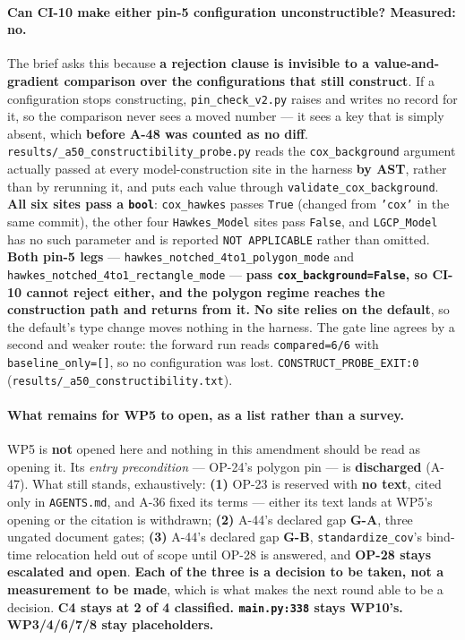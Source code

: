 \documentclass[
  10pt,
]{article}
\begin{document}
\paragraph{Can CI-10 make either pin-5 configuration unconstructible? Measured: no.}
The brief asks this because \textbf{a rejection clause is invisible to a value-and-gradient comparison over the configurations that still construct}. If a configuration stops constructing, \texttt{pin\_check\_v2.py} raises and writes no record for it, so the comparison never sees a moved number --- it sees a key that is simply absent, which \textbf{before A-48 was counted as no diff}. \texttt{results/\allowbreak{}\_a50\_constructibility\_probe.py} reads the \texttt{cox\_background} argument actually passed at every model-construction site in the harness \textbf{by AST}, rather than by rerunning it, and puts each value through \texttt{validate\_cox\_background}. \textbf{All six sites pass a \texttt{bool}}: \texttt{cox\_hawkes} passes \texttt{True} (changed from \texttt{'cox'} in the same commit), the other four \texttt{Hawkes\_Model} sites pass \texttt{False}, and \texttt{LGCP\_Model} has no such parameter and is reported \texttt{NOT APPLICABLE} rather than omitted. \textbf{Both pin-5 legs} --- \texttt{hawkes\_notched\_4to1\_polygon\_mode} and \texttt{hawkes\_notched\_4to1\_rectangle\_mode} --- \textbf{pass \texttt{cox\_background=False}, so CI-10 cannot reject either, and the polygon regime reaches the construction path and returns from it.} \textbf{No site relies on the default}, so the default's type change moves nothing in the harness. The gate line agrees by a second and weaker route: the forward run reads \texttt{compared=6/6} with \texttt{baseline\_only=[]}, so no configuration was lost. \texttt{CONSTRUCT\_PROBE\_EXIT:0} (\texttt{results/\allowbreak{}\_a50\_constructibility.txt}).

\paragraph{What remains for WP5 to open, as a list rather than a survey.}
WP5 is \textbf{not} opened here and nothing in this amendment should be read as opening it. Its \emph{entry precondition} --- OP-24's polygon pin --- is \textbf{discharged} (A-47). What still stands, exhaustively: \textbf{(1)} OP-23 is reserved with \textbf{no text}, cited only in \texttt{AGENTS.md}, and A-36 fixed its terms --- either its text lands at WP5's opening or the citation is withdrawn; \textbf{(2)} A-44's declared gap \textbf{G-A}, three ungated document gates; \textbf{(3)} A-44's declared gap \textbf{G-B}, \texttt{standardize\_cov}'s bind-time relocation held out of scope until OP-28 is answered, and \textbf{OP-28 stays escalated and open}. \textbf{Each of the three is a decision to be taken, not a measurement to be made}, which is what makes the next round able to be a decision. \textbf{C4 stays at 2 of 4 classified. \texttt{main.py:338} stays WP10's. WP3/4/6/7/8 stay placeholders.}
\end{document}
